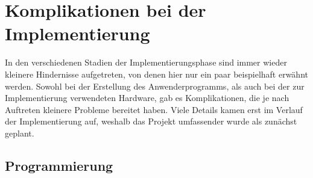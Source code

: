 \section{Komplikationen bei der Implementierung}

	In den verschiedenen Stadien der Implementierungsphase sind immer wieder kleinere Hindernisse aufgetreten, von denen hier nur ein paar beispielhaft erwähnt werden. Sowohl bei der Erstellung des Anwenderprogramms, als auch bei der zur Implementierung verwendeten Hardware, gab es Komplikationen, die je nach Auftreten kleinere Probleme bereitet haben. Viele Details kamen erst im Verlauf der Implementierung auf, weshalb das Projekt umfassender wurde als zunächst geplant. 
	
	\subsection{Programmierung}
		
